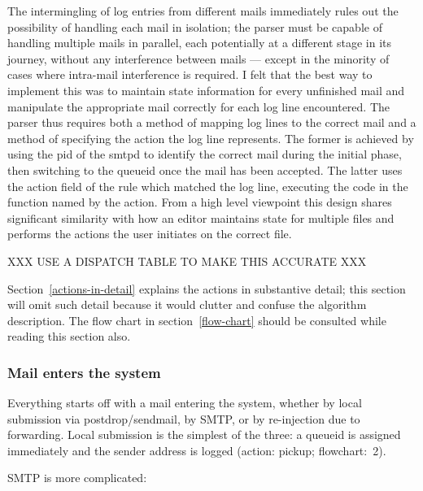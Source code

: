 \documentclass[a4paper,12pt,draft]{article}
\begin{document}
The intermingling of log entries from different mails immediately rules out
the possibility of handling each mail in isolation; the parser must be
capable of handling multiple mails in parallel, each potentially at a
different stage in its journey, without any interference between mails ---
except in the minority of cases where intra-mail interference is required.
I felt that the best way to implement this was to maintain state
information for every unfinished mail and manipulate the appropriate mail
correctly for each log line encountered.  The parser thus requires both a
method of mapping log lines to the correct mail and a method of specifying
the action the log line represents.  The former is achieved by using the
pid of the smtpd to identify the correct mail during the initial phase,
then switching to the queueid once the mail has been accepted.  The latter
uses the action field of the rule which matched the log line, executing the
code in the function named by the action.  From a high level viewpoint this
design shares significant similarity with how an editor maintains state for
multiple files and performs the actions the user initiates on the correct
file.

XXX USE A DISPATCH TABLE TO MAKE THIS ACCURATE XXX

Section~\ref{actions-in-detail} explains the actions in substantive detail;
this section will omit such detail because it would clutter and confuse the
algorithm description.  The flow chart in section~\ref{flow-chart} should
be consulted while reading this section also.

\subsubsection{Mail enters the system}

\label{mail-enters-the-system}

Everything starts off with a mail entering the system, whether by local
submission via postdrop/sendmail, by SMTP, or by re-injection due to
forwarding.  Local submission is the simplest of the three: a queueid is
assigned immediately and the sender address is logged (action: pickup;
flowchart:~2).

SMTP is more complicated: 
\end{document}
